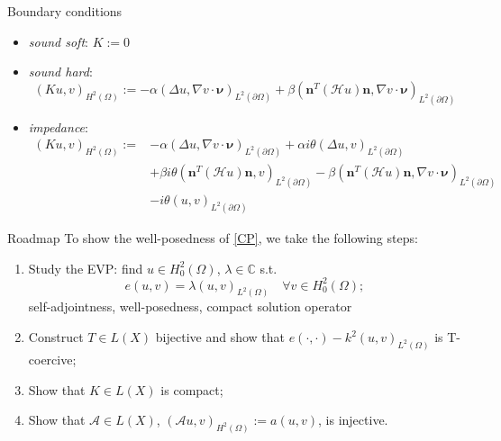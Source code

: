 \documentclass[11pt,aspectratio=169,xcolor=dvipsnames]{beamer}
\newcommand{\nv}{\bm{\nu}}
\newcommand{\nicearrow}[2]{\raisebox{#2}{\resizebox{0.45cm}{!}{\color{#1}{\MVRightArrow}\color{black}}}}
\begin{document}
\begin{frame}{Boundary conditions}
  \begin{itemize}
    \item \emph{sound soft}: $K := 0$
    \item \emph{sound hard}: 
    \begin{equation*}
      (Ku,v)_{H^2(\Omega)} := - \alpha (\Delta u, \nabla v \cdot \nv)_{L^2(\partial \Omega)} + \beta (\bm{n}^T(\mathcal{H} u) \bm{n},\nabla v \cdot \nv)_{L^2(\partial \Omega)} 
    \end{equation*}
    \item \emph{impedance}:
    \begin{equation*}
      \begin{aligned}
        (Ku,v)_{H^2(\Omega)} := &- \alpha (\Delta u, \nabla v \cdot \nv)_{L^2(\partial \Omega)} + \alpha i \theta (\Delta u, v)_{L^2(\partial \Omega)} \\
        &+ \beta i \theta (\bm{n}^T(\mathcal{H} u) \bm{n},v)_{L^2(\partial \Omega)} - \beta (\bm{n}^T(\mathcal{H} u) \bm{n},\nabla v \cdot \nv)_{L^2(\partial \Omega)} \\
        &- i \theta (u,v)_{L^2(\partial \Omega)}
      \end{aligned}
    \end{equation*}
  \end{itemize}
\end{frame}


\begin{frame}{Roadmap}
  To show the well-posedness of \eqref{CP}, we take the following steps: 
  \begin{enumerate}
    \item<1-> Study the EVP: find $u \in H^2_0(\Omega)$, $\lambda \in \mathbb{C}$ s.t. 
    \begin{equation*}
      e(u,v) = \lambda (u,v)_{L^2(\Omega)} \quad \forall v \in H^2_0(\Omega);
    \end{equation*}
    \nicearrow{GOE}{-0.07cm} self-adjointness, well-posedness, compact solution operator
    \item<2-> Construct $T \in L(X)$ bijective and show that $e(\cdot,\cdot) - k^2(u,v)_{L^2(\Omega)}$ is T-coercive;
    \item<3-> Show that $K \in L(X)$ is compact;
    \item<4-> Show that $\mathcal{A} \in L(X)$, $(\mathcal{A}u,v)_{H^2(\Omega)} := a(u,v)$, is injective.
  \end{enumerate}
  \begin{center}
  \end{center}
  \vspace*{-0.25cm}
\end{frame}
\end{document}
